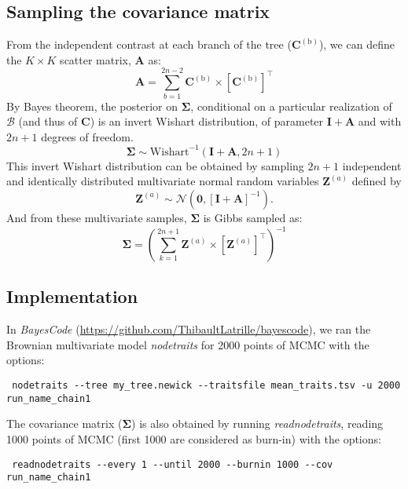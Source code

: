 \documentclass{article}
\newcommand{\MultiplyMatrix}{\times}
\newcommand{\UniDimArray}[1]{\bm{#1}}
\newcommand{\BiDimArray}[1]{\bm{#1}}
\newcommand{\tr}{^{\intercal}}
\newcommand{\inv}{^{-1}}
\newcommand{\NbrTaxa}{n}
\newcommand{\branch}{\text{b}}
\newcommand{\branchexp}{^{(\branch)}}
\newcommand{\Nbranch}{2 \NbrTaxa - 2}
\newcommand{\WishartPostDf}{2 \NbrTaxa + 1}
\newcommand{\Ntrait}{K}
\newcommand{\contrast}{\UniDimArray{C}}
\newcommand{\Covariancematrix}{\Sigma}
\newcommand{\CovarianceMatrix}{\BiDimArray{\Covariancematrix}}
\newcommand{\Identitymatrix}{\BiDimArray{I}}
\newcommand{\brownian}{\mathcal{B}}
\newcommand{\Scattermatrix}{\BiDimArray{A}}
\newcommand{\Multivariate}{\UniDimArray{Z}}
\newcommand{\indice}{a}
\newcommand{\indiceexp}{^{(\indice)}}
\newcommand{\vecZero}{\UniDimArray{0}}
\begin{document}
\subsection{Sampling the covariance matrix}
From the independent contrast at each branch of the tree ($\contrast\branchexp$), we can define the $\Ntrait \times \Ntrait$ scatter matrix, $\Scattermatrix$ as:
\begin{equation}
    \Scattermatrix = \sum\limits_{b=1}^{\Nbranch} \contrast\branchexp \MultiplyMatrix \left[\contrast\branchexp\right]\tr
\end{equation}
By Bayes theorem, the {posterior} on $\CovarianceMatrix$, conditional on a particular realization of $\brownian$ (and thus of $\contrast$) is an invert Wishart distribution, of parameter $\Identitymatrix + \Scattermatrix$ and with $\WishartPostDf$ degrees of freedom.
\begin{equation}
    \CovarianceMatrix \sim \text{Wishart}^{-1}\left( \Identitymatrix + \Scattermatrix, \WishartPostDf\right)
\end{equation}
This invert Wishart distribution can be obtained by sampling $\WishartPostDf$ independent and identically distributed multivariate normal random variables $\Multivariate\indiceexp$ defined by
\begin{equation}
    \Multivariate\indiceexp \sim \mathcal{N} \left( \vecZero, \left[ \Identitymatrix + \Scattermatrix\right]^{-1} \right).
\end{equation}
And from these multivariate samples, $\CovarianceMatrix$ is Gibbs sampled as:
\begin{equation}
    \CovarianceMatrix = \left( \sum\limits_{k=1}^{\WishartPostDf} \Multivariate\indiceexp \MultiplyMatrix  \left[\Multivariate\indiceexp \right] \tr \right)\inv
\end{equation}

\subsection{Implementation}
\label{sec:site-specific-mutation-selection-codon-models}
In \textit{BayesCode} (\url{https://github.com/ThibaultLatrille/bayescode}), we ran the Brownian multivariate model \textit{nodetraits} for 2000 points of MCMC with the options:
\begin{scriptsize}
    \begin{verbatim}
 nodetraits --tree my_tree.newick --traitsfile mean_traits.tsv -u 2000 run_name_chain1
    \end{verbatim}
\end{scriptsize}
The covariance matrix ($\CovarianceMatrix$) is also obtained by running \textit{readnodetraits}, reading 1000 points of MCMC (first 1000 are considered as burn-in) with the options:
\begin{scriptsize}
    \begin{verbatim}
 readnodetraits --every 1 --until 2000 --burnin 1000 --cov run_name_chain1
    \end{verbatim}
\end{scriptsize}
\end{document}
